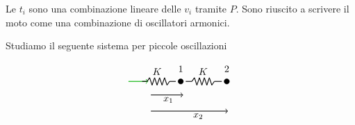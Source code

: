 Le \(t_i\) sono una combinazione lineare delle \(v_i\) tramite \(P\).
Sono riuscito a scrivere il moto come una combinazione di oscillatori armonici.
\begin{example}{}
Studiamo il seguente sistema per piccole oscillazioni

\[
\begin{tikzpicture}[scale=0.9]
  \draw[green!70!black, thick, ->] (-0.2,0.4) -- (0.6,0.4);

  \draw[thick] (0.35,0.4) -- (0.55,0.4);
  \draw[thick] (0.55,0.4) -- (0.65,0.55);
  \draw[thick] (0.65,0.55) -- (0.75,0.25);
  \draw[thick] (0.75,0.25) -- (0.85,0.55);
  \draw[thick] (0.85,0.55) -- (0.95,0.25);
  \draw[thick] (0.95,0.25) -- (1.05,0.55);
  \draw[thick] (1.05,0.55) -- (1.15,0.25);
  \draw[thick] (1.15,0.25) -- (1.25,0.55);
  \draw[thick] (1.25,0.55) -- (1.35,0.25);
  \draw[thick] (1.35,0.25) -- (1.45,0.4);
  \draw[thick] (1.45,0.4) -- (1.7,0.4);

  \filldraw[black] (1.9,0.4) circle (3pt);
  \node at (1.9,0.9) {$1$};
  \node at (0.95,0.8) {$K$};

  \draw[thick] (2.1,0.4) -- (2.35,0.4);
  \draw[thick] (2.35,0.4) -- (2.45,0.55);
  \draw[thick] (2.45,0.55) -- (2.55,0.25);
  \draw[thick] (2.55,0.25) -- (2.65,0.55);
  \draw[thick] (2.65,0.55) -- (2.75,0.25);
  \draw[thick] (2.75,0.25) -- (2.85,0.55);
  \draw[thick] (2.85,0.55) -- (2.95,0.25);
  \draw[thick] (2.95,0.25) -- (3.05,0.55);
  \draw[thick] (3.05,0.55) -- (3.15,0.25);
  \draw[thick] (3.15,0.25) -- (3.25,0.4);
  \draw[thick] (3.25,0.4) -- (3.55,0.4);

  \filldraw[black] (3.75,0.4) circle (3pt);
  \node at (3.75,0.9) {$2$};
  \node at (2.8,0.8) {$K$};

  \draw[->, thick] (0.7,-0.15) -- (2.0,-0.15);
  \node at (1.4,-0.35) {$x_1$};

  \draw[->, thick] (0.7,-0.8) -- (3.8,-0.8);
  \node at (2.6,-1) {$x_2$};
\end{tikzpicture}
\]


\end{example}
